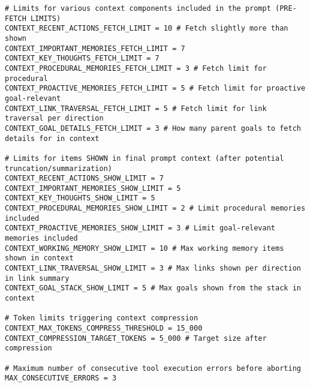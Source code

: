 \documentclass[12pt,a4paper]{article}
\begin{document}
\begin{pageablecode}
\begin{verbatim}
# Limits for various context components included in the prompt (PRE-FETCH LIMITS)
CONTEXT_RECENT_ACTIONS_FETCH_LIMIT = 10 # Fetch slightly more than shown
CONTEXT_IMPORTANT_MEMORIES_FETCH_LIMIT = 7
CONTEXT_KEY_THOUGHTS_FETCH_LIMIT = 7
CONTEXT_PROCEDURAL_MEMORIES_FETCH_LIMIT = 3 # Fetch limit for procedural
CONTEXT_PROACTIVE_MEMORIES_FETCH_LIMIT = 5 # Fetch limit for proactive goal-relevant
CONTEXT_LINK_TRAVERSAL_FETCH_LIMIT = 5 # Fetch limit for link traversal per direction
CONTEXT_GOAL_DETAILS_FETCH_LIMIT = 3 # How many parent goals to fetch details for in context

# Limits for items SHOWN in final prompt context (after potential truncation/summarization)
CONTEXT_RECENT_ACTIONS_SHOW_LIMIT = 7
CONTEXT_IMPORTANT_MEMORIES_SHOW_LIMIT = 5
CONTEXT_KEY_THOUGHTS_SHOW_LIMIT = 5
CONTEXT_PROCEDURAL_MEMORIES_SHOW_LIMIT = 2 # Limit procedural memories included
CONTEXT_PROACTIVE_MEMORIES_SHOW_LIMIT = 3 # Limit goal-relevant memories included
CONTEXT_WORKING_MEMORY_SHOW_LIMIT = 10 # Max working memory items shown in context
CONTEXT_LINK_TRAVERSAL_SHOW_LIMIT = 3 # Max links shown per direction in link summary
CONTEXT_GOAL_STACK_SHOW_LIMIT = 5 # Max goals shown from the stack in context

# Token limits triggering context compression
CONTEXT_MAX_TOKENS_COMPRESS_THRESHOLD = 15_000
CONTEXT_COMPRESSION_TARGET_TOKENS = 5_000 # Target size after compression

# Maximum number of consecutive tool execution errors before aborting
MAX_CONSECUTIVE_ERRORS = 3


\end{verbatim}
\end{pageablecode}
\end{document}
